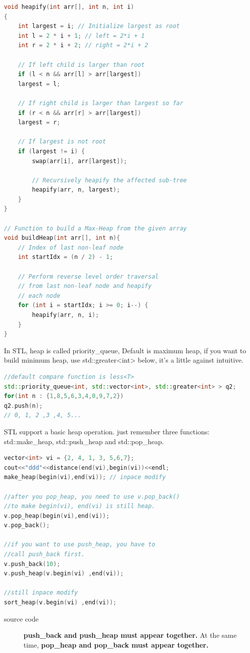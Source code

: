 \documentclass[a4paper,11pt,twoside]{book}
\begin{document}
\begin{lstlisting}[frame=single, language=c++]
void heapify(int arr[], int n, int i)
{
	int largest = i; // Initialize largest as root
	int l = 2 * i + 1; // left = 2*i + 1
	int r = 2 * i + 2; // right = 2*i + 2
	
	// If left child is larger than root
	if (l < n && arr[l] > arr[largest])
	largest = l;
	
	// If right child is larger than largest so far
	if (r < n && arr[r] > arr[largest])
	largest = r;
	
	// If largest is not root
	if (largest != i) {
		swap(arr[i], arr[largest]);
		
		// Recursively heapify the affected sub-tree
		heapify(arr, n, largest);
	}
}

// Function to build a Max-Heap from the given array
void buildHeap(int arr[], int n){
	// Index of last non-leaf node
	int startIdx = (n / 2) - 1;
	
	// Perform reverse level order traversal
	// from last non-leaf node and heapify
	// each node
	for (int i = startIdx; i >= 0; i--) {
		heapify(arr, n, i);
	}
}
\end{lstlisting}



\par In STL, heap is called priority\_queue, Default is maximum heap, if you want to build minimum heap, use std::greater<int> below, it's a little against intuitive. 

\begin{lstlisting}[frame=single, language=c++, mathescape=true, basicstyle=\scriptsize]
//default compare function is less<T>
std::priority_queue<int, std::vector<int>, std::greater<int> > q2;
for(int n : {1,8,5,6,3,4,0,9,7,2})
q2.push(n);
// 0, 1, 2 ,3 ,4, 5...		
\end{lstlisting}


\par STL support a basic heap operation. just remember three functions: std::make\_heap, std::push\_heap and std::pop\_heap.

\begin{lstlisting}[frame=single, language=c++, mathescape=true]
vector<int> vi = {2, 4, 1, 3, 5,6,7};
cout<<"ddd"<<distance(end(vi),begin(vi))<<endl;
make_heap(begin(vi),end(vi)); // inpace modify

//after you pop_heap, you need to use v.pop_back()
//to make begin(vi), end(vi) is still heap. 
v.pop_heap(begin(vi),end(vi));
v.pop_back();

//if you want to use push_heap, you have to 
//call push_back first. 
v.push_back(10);
v.push_heap(v.begin(vi) ,end(vi));

//still inpace modify
sort_heap(v.begin(vi) ,end(vi));	
\end{lstlisting}
\begin{description}
	\item[source code] \textbf{push\_back and push\_heap must appear together.} At the same time, \textbf{pop\_heap and pop\_back must appear together. }
\end{description}
\end{document}
